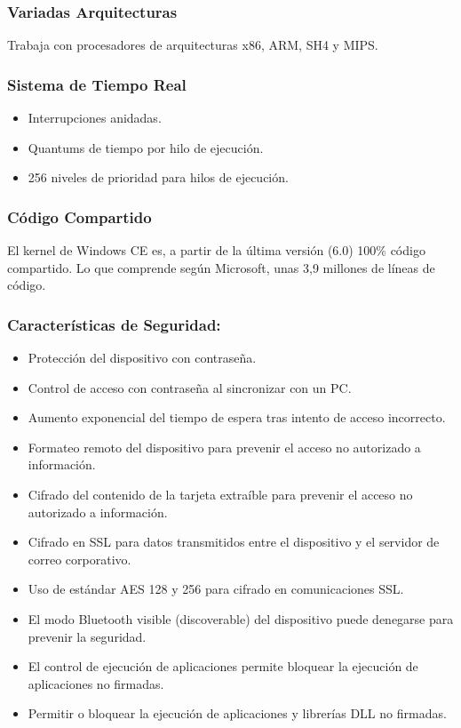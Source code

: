 \subsubsection*{Variadas Arquitecturas}
Trabaja con procesadores de arquitecturas x86, ARM, SH4 y MIPS.

\subsubsection*{Sistema de Tiempo Real}
\begin{itemize}
	\item Interrupciones anidadas.
	\item Quantums de tiempo por hilo de ejecución.
	\item 256 niveles de prioridad para hilos de ejecución.
\end{itemize}

\subsubsection*{Código Compartido}
El kernel de Windows CE es, a partir de la última versión (6.0) 100\% código compartido. Lo que comprende según Microsoft, unas 3,9 millones de líneas de código.

\subsubsection*{Características de Seguridad:}
\begin{itemize}
	\item Protección del dispositivo con contraseña.
	\item Control de acceso con contraseña al sincronizar con un PC.
	\item Aumento exponencial del tiempo de espera tras intento de acceso incorrecto.
	\item Formateo remoto del dispositivo para prevenir el acceso no autorizado a información.
	\item Cifrado del contenido de la tarjeta extraíble para prevenir el acceso no autorizado a información.
	\item Cifrado en SSL para datos transmitidos entre el dispositivo y el servidor de correo corporativo.
	\item Uso de estándar AES 128 y 256 para cifrado en comunicaciones SSL.
	\item El modo Bluetooth visible (discoverable) del dispositivo puede denegarse para prevenir la seguridad.
	\item El control de ejecución de aplicaciones permite bloquear la ejecución de aplicaciones no firmadas.
	\item Permitir o bloquear la ejecución de aplicaciones y librerías DLL no firmadas.   
\end{itemize}

